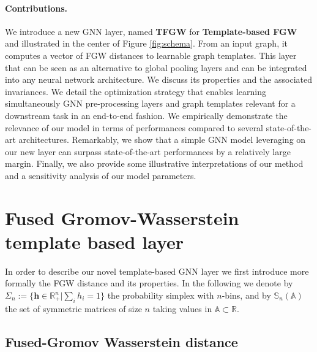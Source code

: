 \documentclass{article}
\def\vh{{\bm{h}}}
\def\sA{{\mathbb{A}}}
\def\sR{{\mathbb{R}}}
\def\sS{{\mathbb{S}}}
\newcommand{\R}{\mathbb{R}}
\begin{document}
\paragraph{Contributions.} We introduce a new GNN layer, named \textbf{TFGW} for
\textbf{Template-based FGW} and illustrated in the center of Figure \ref{fig:schema}. From
an input graph, it computes a vector of FGW distances to learnable graph
templates. This layer that can
be seen as an alternative to global pooling layers and can be
integrated into any neural network architecture.
We discuss its properties and the associated invariances. We detail the
optimization strategy that enables learning simultaneously GNN pre-processing
layers and graph
templates relevant for a downstream task in an end-to-end fashion. We 
empirically demonstrate the relevance of our model in terms of performances
compared to several state-of-the-art architectures. Remarkably, we show
that a simple GNN model leveraging on our new layer can surpass state-of-the-art performances by a relatively large margin. Finally, we also provide some
illustrative interpretations of our method and a sensitivity analysis of our model parameters. 	\label{sec:intro}
	
	\section{Fused Gromov-Wasserstein template based layer}
	

In order to describe our novel template-based GNN layer we first introduce more formally the FGW distance and its properties. In the following we denote by $\Sigma_n := \{ \vh \in \sR_+^n | \sum_{i} h_i = 1 \}$ the probability simplex
with $n$-bins, and by $\sS_n(\sA)$ the set of symmetric matrices of size $n$
taking values in $\sA \subset \R$.


\subsection{Fused-Gromov Wasserstein distance \label{subsec:FGW}} 
\end{document}

